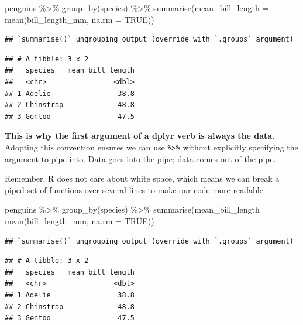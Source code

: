 \documentclass[
]{book}
\newenvironment{Shaded}{\begin{snugshade}}{\end{snugshade}}
\newcommand{\AttributeTok}[1]{\textcolor[rgb]{0.77,0.63,0.00}{#1}}
\newcommand{\ConstantTok}[1]{\textcolor[rgb]{0.00,0.00,0.00}{#1}}
\newcommand{\FunctionTok}[1]{\textcolor[rgb]{0.00,0.00,0.00}{#1}}
\newcommand{\NormalTok}[1]{#1}
\newcommand{\SpecialCharTok}[1]{\textcolor[rgb]{0.00,0.00,0.00}{#1}}
\begin{document}
\begin{Shaded}
\begin{Highlighting}[]
\NormalTok{penguins }\SpecialCharTok{\%\textgreater{}\%} \FunctionTok{group\_by}\NormalTok{(species) }\SpecialCharTok{\%\textgreater{}\%} \FunctionTok{summarise}\NormalTok{(}\AttributeTok{mean\_bill\_length =} \FunctionTok{mean}\NormalTok{(bill\_length\_mm, }\AttributeTok{na.rm =} \ConstantTok{TRUE}\NormalTok{))}
\end{Highlighting}
\end{Shaded}

\begin{verbatim}
## `summarise()` ungrouping output (override with `.groups` argument)
\end{verbatim}

\begin{verbatim}
## # A tibble: 3 x 2
##   species   mean_bill_length
##   <chr>                <dbl>
## 1 Adelie                38.8
## 2 Chinstrap             48.8
## 3 Gentoo                47.5
\end{verbatim}

\textbf{This is why the first argument of a dplyr verb is always the data}. Adopting this convention ensures we can use \texttt{\%\textgreater{}\%} without explicitly specifying the argument to pipe into. Data goes into the pipe; data comes out of the pipe.

Remember, R does not care about white space, which means we can break a piped set of functions over several lines to make our code more readable:

\begin{Shaded}
\begin{Highlighting}[]
\NormalTok{penguins }\SpecialCharTok{\%\textgreater{}\%} 
  \FunctionTok{group\_by}\NormalTok{(species) }\SpecialCharTok{\%\textgreater{}\%} 
  \FunctionTok{summarise}\NormalTok{(}\AttributeTok{mean\_bill\_length =} \FunctionTok{mean}\NormalTok{(bill\_length\_mm, }\AttributeTok{na.rm =} \ConstantTok{TRUE}\NormalTok{))}
\end{Highlighting}
\end{Shaded}

\begin{verbatim}
## `summarise()` ungrouping output (override with `.groups` argument)
\end{verbatim}

\begin{verbatim}
## # A tibble: 3 x 2
##   species   mean_bill_length
##   <chr>                <dbl>
## 1 Adelie                38.8
## 2 Chinstrap             48.8
## 3 Gentoo                47.5
\end{verbatim}
\end{document}
